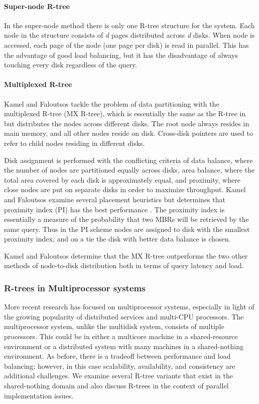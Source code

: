 \paragraph{Super-node R-tree}
In the super-node method \cite{kamel1992parallel,thebook} there is only
one R-tree structure for the system. Each node in the structure consists of
\emph{d} pages distributed across \emph{d} disks. When node is accessed, each
page of the node (one page per disk) is read in parallel. This has the 
advantage of good load balancing, but it has the disadvantage of
always touching every disk regardless of the query.

\paragraph{Multiplexed R-tree}
Kamel and Faloutsos tackle the problem of data partitioning with the 
multiplexed R-tree (MX R-tree)\cite{kamel1992parallel}, which is 
essentially the same as the R-tree in \cite{guttman84} but distributes the 
nodes across different disks. The root node always resides in main memory, 
and all other nodes reside on disk. Cross-disk pointers are used to refer 
to child nodes residing in different disks. 

Disk assignment is performed with the conflicting criteria of
data balance, where the number of nodes are partitioned equally across disks, 
area balance, where the total area covered by each disk is approximately 
equal, and proximity, where close nodes are put on separate disks in order to
maximize throughput. Kamel and Faloutsos examine several placement 
heuristics but determines that proximity index (PI) has the best performance 
\cite{kamel1992parallel}. The proximity index is essentially a measure of the 
probability that two MBRs
will be retrieved by the same query. Thus in the PI scheme nodes are assigned 
to disk with the smallest proximity index, and on a tie the disk with better 
data balance is chosen.

Kamel and Faloutsos determine that the MX R-tree outperforms the two other 
methods of node-to-disk distribution both in terms of query latency and load.
 
\subsubsection{R-trees in Multiprocessor systems}
More recent research has focused on multiprocessor systems, especially in 
light of the growing popularity of distributed services and multi-CPU processors.
The multiprocessor system, unlike the multidisk system, consists of multiple 
processors. This could be in either a multicore machine in a shared-resource
environment or a distributed system with many machines in a shared-nothing 
environment. As before, there is a tradeoff between performance and load 
balancing; however, in this case scalability, availability, and consistency
are additional challenges. We examine several R-tree variants that exist in
the shared-nothing domain and also discuss R-trees in the context of parallel 
implementation issues.

